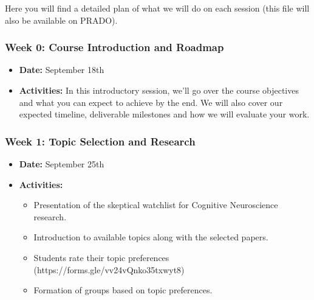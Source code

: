 \documentclass[
  letterpaper,
  DIV=11,
  numbers=noendperiod]{scrreprt}
\providecommand{\tightlist}{%
  \setlength{\itemsep}{0pt}\setlength{\parskip}{0pt}}\usepackage{longtable,booktabs,array}
\begin{document}
Here you will find a detailed plan of what we will do on each session
(this file will also be available on PRADO).

\begin{tcolorbox}[enhanced jigsaw, toptitle=1mm, colbacktitle=quarto-callout-note-color!10!white, breakable, leftrule=.75mm, titlerule=0mm, colframe=quarto-callout-note-color-frame, opacityback=0, arc=.35mm, opacitybacktitle=0.6, colback=white, title=\textcolor{quarto-callout-note-color}{\faInfo}\hspace{0.5em}{Roadmap for the Course}, toprule=.15mm, bottomtitle=1mm, coltitle=black, rightrule=.15mm, bottomrule=.15mm, left=2mm]

\subsubsection{Week 0: Course Introduction and
Roadmap}\label{week-0-course-introduction-and-roadmap}

\begin{itemize}
\tightlist
\item
  \textbf{Date:} September 18th
\item
  \textbf{Activities:} In this introductory session, we'll go over the
  course objectives and what you can expect to achieve by the end. We
  will also cover our expected timeline, deliverable milestones and how
  we will evaluate your work.
\end{itemize}

\subsubsection{Week 1: Topic Selection and
Research}\label{week-1-topic-selection-and-research}

\begin{itemize}
\tightlist
\item
  \textbf{Date:} September 25th
\item
  \textbf{Activities:}

  \begin{itemize}
  \tightlist
  \item
    Presentation of the skeptical watchlist for Cognitive Neuroscience
    research.
  \item
    Introduction to available topics along with the selected papers.
  \item
    Students rate their topic preferences
    (https://forms.gle/vv24vQnko35txwyt8)
  \item
    Formation of groups based on topic preferences.
  \end{itemize}
\end{itemize}


\end{tcolorbox}
\end{document}
